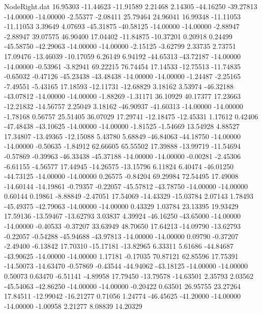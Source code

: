 \begin{filecontents}{NodeRight.dat}
  16.95303  -11.44623  -11.91589     2.21468    2.14305  -44.16250  -39.27813  -14.00000  -14.00000   -2.55377   -2.08411   25.79464   24.96041
  16.99348  -11.11053  -11.11053     3.39649    4.07693  -45.31875  -40.58125  -14.00000  -14.00000   -2.88947   -2.88947   39.07575   46.90400
  17.04402  -11.84875  -10.37201     0.20918    0.24499  -45.58750  -42.29063  -14.00000  -14.00000   -2.15125   -3.62799    2.33735    2.73751
  17.09476  -13.46039  -10.17059     6.26149    6.94192  -44.65313  -43.72187  -14.00000  -14.00000   -0.53961   -3.82941   69.22215   76.74454
  17.14533  -12.75513  -11.74835    -0.65032   -0.47126  -45.23438  -43.48438  -14.00000  -14.00000   -1.24487   -2.25165   -7.49551   -5.43165
  17.18593  -12.11731  -12.68829     3.18162    3.53974  -46.32188  -43.07812  -14.00000  -14.00000   -1.88269   -1.31171   36.10929   40.17377
  17.23663  -12.21832  -14.56757     2.25049    3.18162  -46.90937  -41.60313  -14.00000  -14.00000   -1.78168    0.56757   25.51405   36.07029
  17.29741  -12.18475  -12.45331     1.17612    0.42406  -47.48438  -43.10625  -14.00000  -14.00000   -1.81525   -1.54669   13.54928    4.88527
  17.34807  -13.49365  -12.15088     5.43780    5.68849  -46.84063  -44.18750  -14.00000  -14.00000   -0.50635   -1.84912   62.66605   65.55502
  17.39888  -13.99719  -11.54694    -0.57869   -0.39963  -46.33438  -45.37188  -14.00000  -14.00000   -0.00281   -2.45306   -6.61155   -4.56577
  17.44945  -14.26575  -13.15796     6.11824    6.40474  -46.01250  -44.73125  -14.00000  -14.00000    0.26575   -0.84204   69.29984   72.54495
  17.49008  -14.60144  -14.19861    -0.79357   -0.22057  -45.57812  -43.78750  -14.00000  -14.00000    0.60144    0.19861   -8.88849   -2.47051
  17.54069  -14.43329  -15.03784     2.07143    1.78493  -45.49375  -42.79063  -14.00000  -14.00000    0.43329    1.03784   23.13395   19.93429
  17.59136  -13.59467  -13.62793     3.03837    4.39924  -46.16250  -43.65000  -14.00000  -14.00000   -0.40533   -0.37207   33.63949   48.70650
  17.64213  -14.09790  -13.62793    -0.22057   -0.54288  -45.94688  -43.97813  -14.00000  -14.00000    0.09790   -0.37207   -2.49400   -6.13842
  17.70310  -15.17181  -13.82965     6.33311    5.61686  -44.84687  -43.90625  -14.00000  -14.00000    1.17181   -0.17035   70.87121   62.85596
  17.75391  -14.50073  -14.63470    -0.57869   -0.43544  -44.94062  -43.18125  -14.00000  -14.00000    0.50073    0.63470   -6.51141   -4.89958
  17.79450  -13.79578  -14.63501     2.35793    2.03562  -45.54063  -42.86250  -14.00000  -14.00000   -0.20422    0.63501   26.95755   23.27264
  17.84511  -12.99042  -16.21277     0.71056    1.24774  -46.45625  -41.20000  -14.00000  -14.00000   -1.00958    2.21277    8.08839   14.20329

\end{filecontents}
